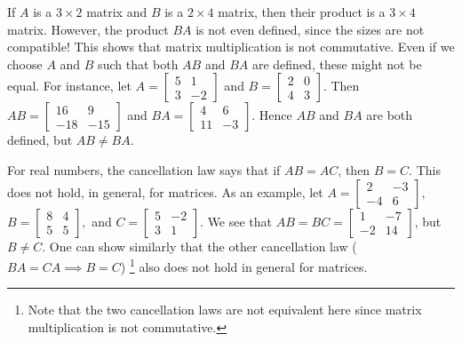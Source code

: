 \documentclass[12pt,letterpaper,reqno]{article}
\numberwithin{equation}{section}
\begin{document}
\begin{example} 
If $A$ is a $3 \times 2$ matrix and $B$ is a $2 \times 4$ matrix, then their product is a $3 \times 4$ matrix. However, the product $BA$ is not even defined, since the sizes are not compatible! This shows that matrix multiplication is not commutative. Even if we choose $A$ and $B$ such that both $AB$ and $BA$ are defined, these might not be equal. For instance, let $A=\begin{bmatrix}
		5&1\\3&-2
	\end{bmatrix}$ and $B=\begin{bmatrix}
		2&0 \\ 4&3
	\end{bmatrix}$. Then $AB=\begin{bmatrix}
	16 & 9 \\ -18 & -15
\end{bmatrix}$ and  $BA=\begin{bmatrix}
	4 & 6 \\ 11 & -3
\end{bmatrix}$. Hence $AB$ and $BA$ are both defined, but $AB \neq BA$.
\end{example}

\begin{example}
For real numbers, the cancellation law says that if $AB=AC$, then $B=C$. This does not hold, in general, for matrices. As an example, let $A=\begin{bmatrix}
		2&-3\\-4&6
	\end{bmatrix},$ $B=\begin{bmatrix}
		8&4\\5&5
	\end{bmatrix},$ and $C=\begin{bmatrix}
		5&-2\\3&1
	\end{bmatrix}$.	We see that $AB=BC=\begin{bmatrix}
	1 & -7 \\ -2 & 14
\end{bmatrix}$, but $B \neq C$. One can show similarly that the other cancellation law ($BA=CA \implies B=C$) \footnote{Note that the two cancellation laws are not equivalent  here since matrix multiplication is not commutative.} also does not hold in general for matrices.
\end{example}
\end{document}
